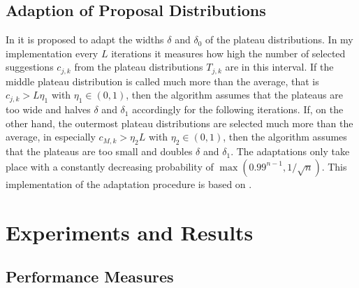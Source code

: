 \documentclass{scrartcl}
\begin{document}
    \subsection{Adaption of Proposal Distributions}
    In \cite{lau2019} it is proposed to adapt the widths $\delta$ and $\delta_0$ of the plateau distributions.
    In my implementation every $L$ iterations it measures how high the number of selected suggestions $c_{j,k}$ from the plateau distributions $T_{j,k}$ are in this interval.
    If the middle plateau distribution is called much more than the average, that is $c_{j,k}>L\eta_1$ with $\eta_1\in(0,1)$, then
    the algorithm assumes that the plateaus are too wide and halves $\delta$ and $\delta_1$ accordingly for
    the following iterations. If, on the other hand, the outermost plateau distributions are selected much more than the average, in especially
    $c_{M,k}>\eta_2L$ with $\eta_2\in(0,1)$, then the algorithm assumes that the plateaus are too small and doubles
    $\delta$ and $\delta_1$. The adaptations only take place with a constantly decreasing probability of $\max(0.99^{n-1},1/\sqrt{n})$. This implementation of the adaptation procedure is based on \cite[Algorithm 2]{lau2019}.

    \section{Experiments and Results}

    \subsection{Performance Measures}
\end{document}
